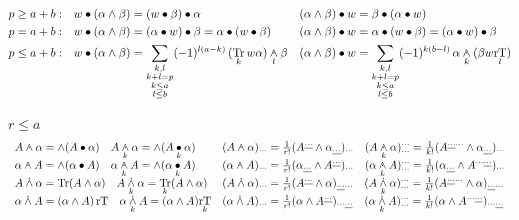 \begin{align*}
  p\geq a+b:&\quad w\bullet(\alpha\wedge\beta) = (w\bullet\beta)\bullet\alpha
  &&(\alpha\wedge\beta)\bullet w = \beta\bullet(\alpha\bullet w) \\
  p = a+b:&\quad w\bullet(\alpha\wedge\beta) = (\alpha\bullet w)\bullet\beta = \alpha\bullet(w\bullet\beta)
  &&(\alpha\wedge\beta)\bullet w = \alpha\bullet(w\bullet\beta) = (\alpha\bullet w)\bullet\beta \\
  p\leq a+b:&\quad w\bullet(\alpha\wedge\beta) = \sum_{\substack{k,l\\k+l=p\\k\leq a\\l\leq b}}(-1)^{l(a-k)}\,(\underset{k}{\mathrm{Tr}}\,w\alpha)\underset{l}{\gmIwedgedot}\beta
  &&(\alpha\wedge\beta)\bullet w = \sum_{\substack{k,l\\k+l=p\\k\leq a\\l\leq b}}(-1)^{k(b-l)}\,\alpha\underset{k}{\gmIwedgedot}(\beta w\underset{l}{\mathrm{rT}})
\end{align*}

$r\leq a$
\[
  \begin{array}{ll}
    A\gmIwedgedot\alpha = \wedge(A\bullet\alpha) \quad A\underset{k}{\gmIwedgedot}\alpha = \wedge(A\underset{k}{\bullet}\alpha) &
    (A\gmIwedgedot\alpha)_{\cdots} = \frac1{r!}(A^{\underline{\cdots}}\wedge\alpha_{\underline{\cdots}})_{\cdots} \quad
    (A\underset{k}{\gmIwedgedot}\alpha)^{\cdots}_{\cdots} = \frac1{k!}(A^{\underline{\cdots}\cdots}\wedge\alpha_{\underline{\cdots}})_{\cdots} \\[4pt]
    \alpha\gmIwedgedot A = \wedge(\alpha\bullet A) \quad \alpha\underset{k}{\gmIwedgedot}A = \wedge(\alpha\underset{k}{\bullet}A) &
    (\alpha\gmIwedgedot A)_{\cdots} = \frac1{r!}(\alpha_{\underline{\cdots}}\wedge A^{\underline{\cdots}})_{\cdots} \quad
    (\alpha\underset{k}{\gmIwedgedot}A)^{\cdots}_{\cdots} = \frac1{k!}(\alpha_{\underline{\cdots}}\wedge A^{\cdots\underline{\cdots}})_{\cdots} \\[4pt]
    A\gmIdotwedge\alpha = \mathrm{Tr}(A\wedge\alpha) \quad A\underset{k}{\gmIdotwedge}\alpha = \underset{k}{\mathrm{Tr}}(A\wedge\alpha) &
    (A\gmIdotwedge\alpha)_{\cdots} = \frac1{r!}(A^{\underline{\cdots}}\wedge\alpha)_{\underline{\cdots}\cdots} \quad
    (A\underset{k}{\gmIdotwedge}\alpha)^{\cdots}_{\cdots} = \frac1{k!}(A^{\underline{\cdots}\cdots}\wedge\alpha)_{\underline{\cdots}\cdots} \\[4pt]
    \alpha\gmIdotwedge A = (\alpha\wedge A)\,\mathrm{rT} \quad \alpha\underset{k}{\gmIdotwedge}A = (\alpha\wedge A)\underset{k}{\mathrm{rT}} &
    (\alpha\gmIdotwedge A)_{\cdots} = \frac1{r!}(\alpha\wedge A^{\underline{\cdots}})_{\cdots\underline{\cdots}} \quad
    (\alpha\underset{k}{\gmIdotwedge}A)^{\cdots}_{\cdots} = \frac1{k!}(\alpha\wedge A^{\cdots\underline{\cdots}})_{\cdots\underline{\cdots}}
  \end{array}
\]

